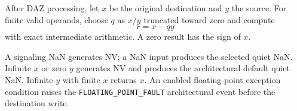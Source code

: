 After DAZ processing, let \(x\) be the original destination and \(y\) the source. For finite valid operands, choose \(q\) as \(x/y\) truncated toward zero and compute
\[
  r = x - qy
\]
with exact intermediate arithmetic. A zero result has the sign of \(x\).

A signaling NaN generates NV; a NaN input produces the selected quiet NaN. Infinite \(x\) or zero \(y\) generates NV and produces the architectural default quiet NaN. Infinite \(y\) with finite \(x\) returns \(x\). An enabled floating-point exception condition raises the \texttt{FLOATING\_POINT\_FAULT} architectural event before the destination write.
